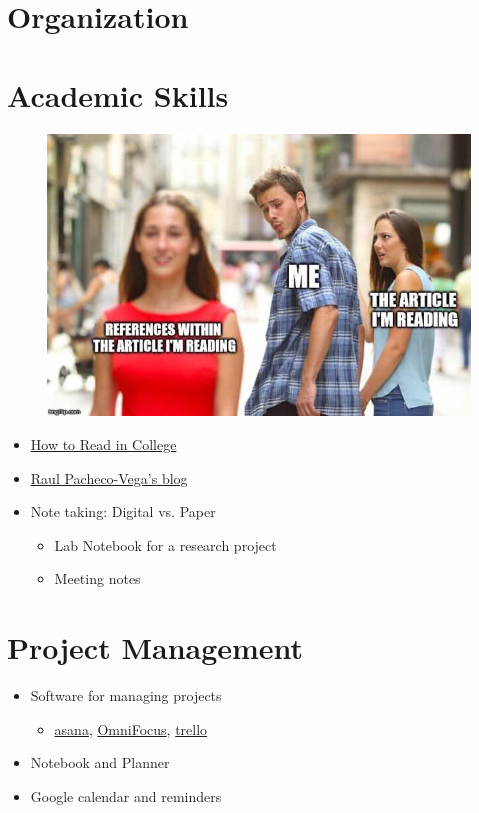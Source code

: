 \documentclass[11pt]{article}
\begin{document}
\section*{Organization}

\section*{Academic Skills}
\begin{figure}[h!]%
  \centering
  \includegraphics[scale=.4]{reading-meme}
  \label{fig:reading}
\end{figure}

\begin{itemize}
  \item \href{https://blogs.swarthmore.edu/burke/permanent-features-advice-on-academia/how-to-read-in-college/}{How to Read in College}
  \item \href{http://www.raulpacheco.org/}{Raul Pacheco-Vega's blog}
  \item Note taking: Digital vs. Paper
  \begin{itemize}
    \item Lab Notebook for a research project
    \item Meeting notes
  \end{itemize}
\end{itemize}

\section*{Project Management}
\begin{itemize}
  \item Software for managing projects
  \begin{itemize}
    \item \href{https://asana.com/}{asana}, \href{https://www.omnigroup.com/omnifocus}{OmniFocus}, \href{https://trello.com/en-US}{trello}
  \end{itemize}
  \item Notebook and Planner
  \item Google calendar and reminders
\end{itemize}
\end{document}
